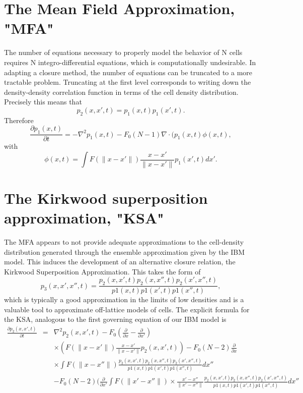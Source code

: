 \documentclass[12pt,letterpaper,cm]{article}
\renewcommand{\.}{\cdot}
\newcommand{\<}{\langle}
\renewcommand{\>}{\rangle}
\begin{document}
	\section{The Mean Field Approximation, "MFA"}
	\indent
	
	
	The number of equations necessary to properly model the behavior of N cells requires N integro-differential equations, which is computationally undesirable.  In adapting a closure method, the number of equations can be truncated to a more tractable problem.  Truncating at the first level corresponds to writing down the density-density correlation function in terms of the cell density distribution.  Precisely this means that
	\[
	p_2(x,x',t)=p_1(x,t)p_1(x',t).
	\]
	Therefore 
	\[
	\frac{\partial p_1(x,t)}{\partial t} = - \nabla^2 p_1(x,t) -F_0(N-1)\nabla \cdot (p_1(x,t)\phi(x,t),
	\]
	with
	\[
	\phi(x,t)=\int F \left( \lVert x -x' \rVert \right) \frac{x -x'}{\lVert x -x' \rVert}p_1(x',t)dx'.
	\]
	\section{The Kirkwood superposition approximation, "KSA"}
	\indent
	
	The MFA appears to not provide adequate approximations to the cell-density distribution generated through the ensemble approximation given by the IBM model.  This induces the development of an alternative closure relation, the Kirkwood Superposition Approximation.  This takes the form of 
	\[
	p_3(x,x',x'',t)=\frac{p_2(x,x',t)p_2(x,x'',t)p_2(x',x'',t)}{p1(x,t)p1(x',t)p1(x'',t)},
	\]
	which is typically a good approximation in the limits of low densities and is a valuable tool to approximate off-lattice models of cells.  The explicit formula for the KSA, analogous to the first governing equation of our IBM model is 
	\[
	\begin{array}{lll}
	\frac{\partial p_2(x,x',t)}{\partial t}&=&\nabla^2 p_2(x,x',t)-F_0(\frac{\partial}{\partial x}-\frac{\partial}{\partial x'})\\
	&&\times\left(F \left( \lVert x -x' \rVert \right) \frac{x-x'}{\lVert x-x' \rVert}p_2(x,x',t)\right)-F_0(N-2)\frac{\partial}{\partial x}\\
	&&\times \int F \left( \lVert x -x'' \rVert \right) \frac{p_2(x,x',t)p_2(x,x'',t)p_2(x',x'',t)}{p1(x,t)p1(x',t)p1(x'',t)}dx''\\
	&&-F_0(N-2)(\frac{\partial}{\partial x'}\int F \left( \lVert x' -x'' \rVert \right)\times \frac{x'-x''}{\lVert x' -x'' \rVert}\frac{p_2(x,x',t)p_2(x,x'',t)p_2(x',x'',t)}{p1(x,t)p1(x',t)p1(x'',t)}dx''
	\end{array}
	\]
\end{document}
